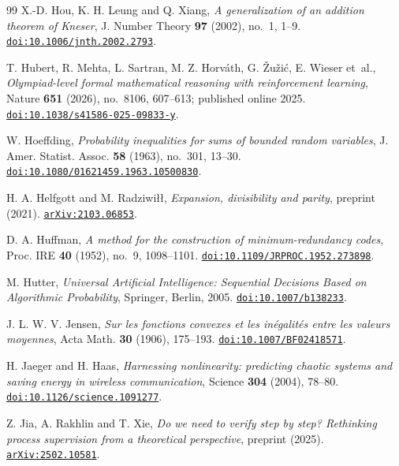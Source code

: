 \begin{thebibliography}{99}
X.-D. Hou, K. H. Leung and Q. Xiang,
\emph{A generalization of an addition theorem of Kneser},
J. Number Theory \textbf{97} (2002), no.~1, 1--9.
\href{https://doi.org/10.1006/jnth.2002.2793}{\nolinkurl{doi:10.1006/jnth.2002.2793}}.

T. Hubert, R. Mehta, L. Sartran, M. Z. Horv\'ath, G. \v{Z}u\v{z}i\'c, E. Wieser et~al.,
\emph{Olympiad-level formal mathematical reasoning with reinforcement learning},
Nature \textbf{651} (2026), no.~8106, 607--613; published online 2025.
\href{https://doi.org/10.1038/s41586-025-09833-y}{\nolinkurl{doi:10.1038/s41586-025-09833-y}}.

W. Hoeffding,
\emph{Probability inequalities for sums of bounded random variables},
J. Amer. Statist. Assoc. \textbf{58} (1963), no.~301, 13--30.
\href{https://doi.org/10.1080/01621459.1963.10500830}{\nolinkurl{doi:10.1080/01621459.1963.10500830}}.

H. A. Helfgott and M. Radziwi\l\l,
\emph{Expansion, divisibility and parity},
preprint (2021).
\href{https://arxiv.org/abs/2103.06853}{\nolinkurl{arXiv:2103.06853}}.

D. A. Huffman,
\emph{A method for the construction of minimum-redundancy codes},
Proc. IRE \textbf{40} (1952), no.~9, 1098--1101.
\href{https://doi.org/10.1109/JRPROC.1952.273898}{\nolinkurl{doi:10.1109/JRPROC.1952.273898}}.

M. Hutter,
\emph{Universal Artificial Intelligence: Sequential Decisions Based on Algorithmic Probability},
Springer, Berlin, 2005.
\href{https://doi.org/10.1007/b138233}{\nolinkurl{doi:10.1007/b138233}}.

J. L. W. V. Jensen,
\emph{Sur les fonctions convexes et les in\'egalit\'es entre les valeurs moyennes},
Acta Math. \textbf{30} (1906), 175--193.
\href{https://doi.org/10.1007/BF02418571}{\nolinkurl{doi:10.1007/BF02418571}}.

H. Jaeger and H. Haas,
\emph{Harnessing nonlinearity: predicting chaotic systems and saving energy in wireless communication},
Science \textbf{304} (2004), 78--80.
\href{https://doi.org/10.1126/science.1091277}{\nolinkurl{doi:10.1126/science.1091277}}.

Z. Jia, A. Rakhlin and T. Xie,
\emph{Do we need to verify step by step? Rethinking process supervision from a theoretical perspective},
preprint (2025).
\href{https://arxiv.org/abs/2502.10581}{\nolinkurl{arXiv:2502.10581}}.


\end{thebibliography}
